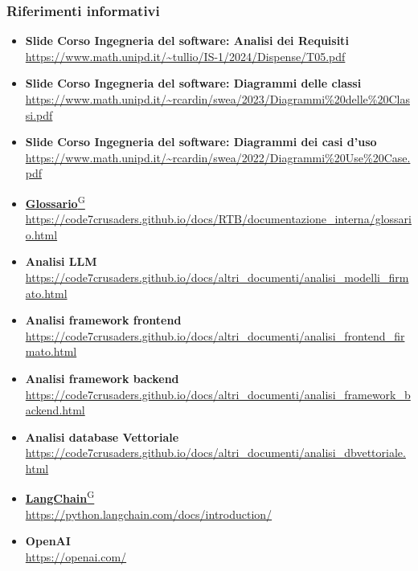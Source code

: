 \subsubsection{Riferimenti informativi}
\begin{itemize}
    \item \textbf{Slide Corso Ingegneria del software: Analisi dei Requisiti} \\ \url{https://www.math.unipd.it/~tullio/IS-1/2024/Dispense/T05.pdf}
    \item \textbf{Slide Corso Ingegneria del software: Diagrammi delle classi} \\ \url{https://www.math.unipd.it/~rcardin/swea/2023/Diagrammi%20delle%20Classi.pdf}
    \item \textbf{Slide Corso Ingegneria del software: Diagrammi dei casi d'uso}\\ \url{https://www.math.unipd.it/~rcardin/swea/2022/Diagrammi%20Use%20Case.pdf}
    \item \href{https://code7crusaders.github.io/docs/RTB/documentazione_interna/glossario.html#glossario}{\textbf{Glossario}\textsuperscript{G}} \\ \url{https://code7crusaders.github.io/docs/RTB/documentazione_interna/glossario.html}
    \item \textbf{Analisi LLM} \\ \url{https://code7crusaders.github.io/docs/altri_documenti/analisi_modelli_firmato.html}
    \item \textbf{Analisi framework frontend} \\ \url{https://code7crusaders.github.io/docs/altri_documenti/analisi_frontend_firmato.html}
    \item \textbf{Analisi framework backend} \\ \url{https://code7crusaders.github.io/docs/altri_documenti/analisi_framework_backend.html}
    \item \textbf{Analisi database Vettoriale} \\ \url{https://code7crusaders.github.io/docs/altri_documenti/analisi_dbvettoriale.html}
    \item \href{https://code7crusaders.github.io/docs/RTB/documentazione_interna/glossario.html#langchain}{\textbf{LangChain}\textsuperscript{G}} \\ \url{https://python.langchain.com/docs/introduction/}
    \item \textbf{OpenAI} \\ \url{https://openai.com/}

\end{itemize}
